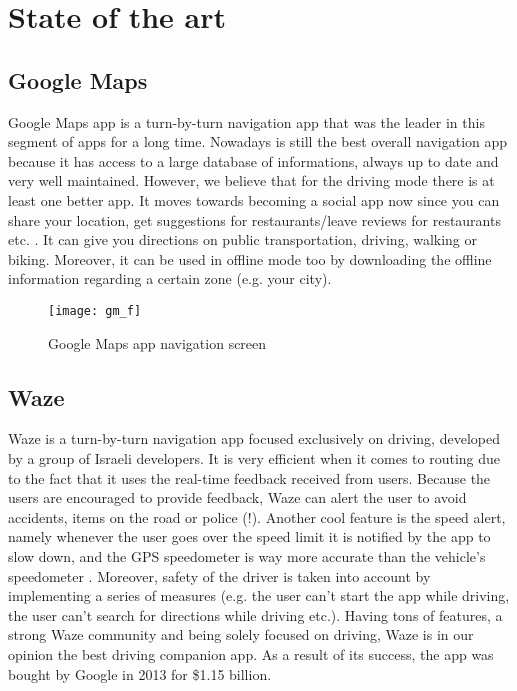\documentclass[11,titlepage]{article}
\begin{document}
\section{State of the art}
	
	\subsection{Google Maps}
			Google Maps app is a turn-by-turn navigation app that was the leader in this segment of apps for a long time. Nowadays is still the best overall navigation app because it has access to a large database of informations, always up to date and very well maintained. However, we believe that for the driving mode there is at least one better app. It moves towards becoming a social app now since you can share your location, get suggestions for restaurants/leave reviews for restaurants etc. . It can give you directions on public transportation, driving, walking or biking. Moreover, it can be used in offline mode too by downloading the offline information regarding a certain zone (e.g. your city).
	\begin{figure}[H]
		\begin{center}
		\texttt{[image: gm\_f]}
		\caption{Google Maps app navigation screen}
		\end{center}
	\end{figure}

	
\subsection{Waze}


	Waze is a turn-by-turn navigation app focused exclusively on driving, developed by a group of Israeli developers. It is very efficient when it comes to routing due to the fact that it uses the real-time feedback received from users. Because the users are encouraged to provide feedback, Waze can alert the user to avoid accidents, items on the road or police (!). Another cool feature is the speed alert, namely whenever the user goes over the speed limit it is notified by the app to slow down, and the GPS speedometer is way more accurate than the vehicle's speedometer . Moreover, safety of the driver is taken into account by implementing a series of measures (e.g. the user can't start the app while driving, the user can't search for directions while driving etc.). Having tons of features, a strong Waze community and being solely focused on driving, Waze is in our opinion the best driving companion app. As a result of its success, the app was bought by Google in 2013 for \$1.15 billion.	
	
\end{document}
